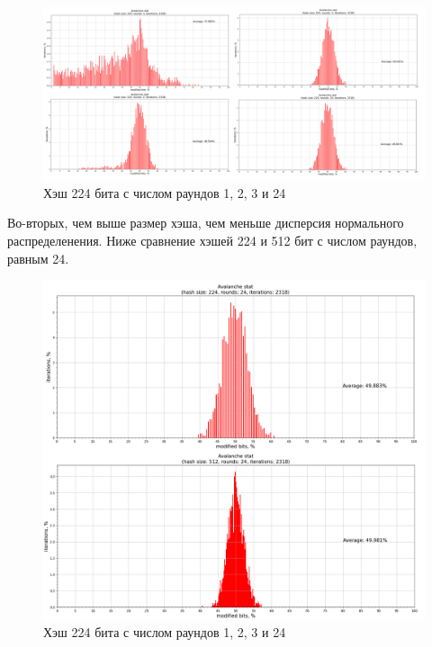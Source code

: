 \documentclass[a4paper,12pt]{article}
\theoremstyle{plain} %
\theoremstyle{definition} %
\theoremstyle{remark} %
\begin{document}
\begin{figure}[ht!]
	\centering
	\includegraphics[width=165mm]{224-1_2_3_24.png}
	\caption{Хэш 224 бита с числом раундов 1, 2, 3 и 24}
\end{figure}

\newpage

Во-вторых, чем выше размер хэша, чем меньше дисперсия нормального распределенения. Ниже сравнение хэшей 224 и 512 бит с числом раундов, равным 24.

\begin{figure}[ht!]
	\centering
	\includegraphics[width=180mm]{224-512_24.png}
	\caption{Хэш 224 бита с числом раундов 1, 2, 3 и 24}
\end{figure}	

	
	
	
	
\end{document}
